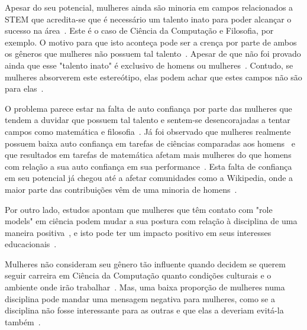 Apesar do seu potencial, mulheres ainda são minoria em campos relacionados a STEM que acredita-se que é necessário um talento inato para poder alcançar o sucesso na área~\cite{leslie2015expectations}. Este é o caso de Ciência da Computação e Filosofia, por exemplo. O motivo para que isto aconteça pode ser a crença por parte de ambos os gêneros que mulheres não possuem tal talento~\cite{tiedemann2000gender,kirkcaldy2007parental}. Apesar de que não foi provado ainda que esse "talento inato" é exclusivo de homens ou mulheres~\cite{hyde2005gender}. Contudo, se mulheres absorverem este estereótipo, elas podem achar que estes campos não são para elas~\cite{wigfield2000expectancy,shapiro2011major}.

O problema parece estar na falta de auto confiança por parte das mulheres que tendem a duvidar que possuem tal talento e sentem-se desencorajadas a tentar campos como matemática e filosofia~\cite{leslie2015expectations}. Já foi observado que mulheres realmente possuem baixa auto confiança em tarefas de ciências comparadas aos homens~\cite{fox1992confidence} e que resultados em tarefas de matemática afetam mais mulheres do que homens com relação a sua auto confiança em sua performance~\cite{campbell1986effects}. Esta falta de confiança em seu potencial já chegou até a afetar comunidades como a Wikipedia, onde a maior parte das contribuições vêm de uma minoria de homens~\cite{antin2011gender,lam2011wp}.

Por outro lado, estudos apontam que mulheres que têm contato com "role models" em ciência podem mudar a sua postura com relação à disciplina de uma maneira positiva~\cite{smith1986effect}, e isto pode ter um impacto positivo em seus interesses educacionais~\cite{nixon1999educational}.


Mulheres não consideram seu gênero tão influente quando decidem se querem seguir carreira em Ciência da Computação quanto condições culturais e o ambiente onde irão trabalhar~\cite{blum2007cultural}. Mas, uma baixa proporção de mulheres numa disciplina pode mandar uma mensagem negativa para mulheres, como se a disciplina não fosse interessante para as outras e que elas a deveriam evitá-la também~\cite{shapiro2011major}.


